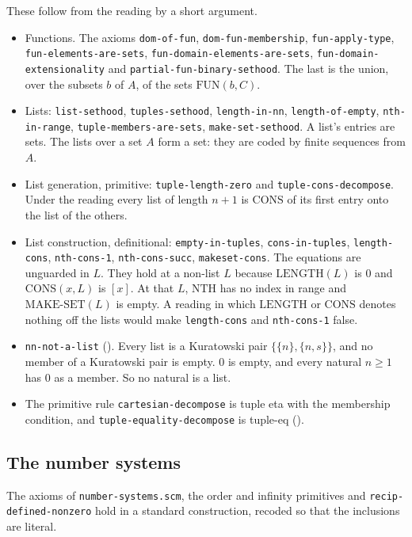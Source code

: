 These follow from the reading by a short argument.
\begin{itemize}
\item Functions.  The axioms \texttt{dom-of-fun},
  \texttt{dom-fun-membership}, \texttt{fun-apply-type},
  \texttt{fun-elements-are-sets},
  \texttt{fun-domain-elements-are-sets},
  \texttt{fun-domain-extensionality} and
  \texttt{partial-fun-binary-sethood}.  The last is the union, over the subsets $b$ of $A$, of the sets
  $\mathrm{FUN}(b,C)$.
\item Lists: \texttt{list-sethood}, \texttt{tuples-sethood},
  \texttt{length-in-nn}, \texttt{length-of-empty}, \texttt{nth-in-range},
  \texttt{tuple-members-are-sets}, \texttt{make-set-sethood}.  A list's
  entries are sets.  The lists over a set $A$ form a set: they are coded
  by finite sequences from $A$.
\item List generation, primitive: \texttt{tuple-length-zero} and
  \texttt{tuple-cons-decompose}.  Under the reading every list of length
  $n+1$ is $\mathrm{CONS}$ of its first entry onto the list of the
  others.
\item List construction, definitional: \texttt{empty-in-tuples},
  \texttt{cons-in-tuples}, \texttt{length-cons}, \texttt{nth-cons-1},
  \texttt{nth-cons-succ}, \texttt{makeset-cons}.  The equations are
  unguarded in $L$.  They hold at a non-list $L$ because
  $\mathrm{LENGTH}(L)$ is $0$ and $\mathrm{CONS}(x,L)$ is $[x]$.  At that
  $L$, $\mathrm{NTH}$ has no index in range and $\mathrm{MAKE\text{-}SET}(L)$
  is empty.  A reading in which $\mathrm{LENGTH}$ or $\mathrm{CONS}$
  denotes nothing off the lists would make \texttt{length-cons} and
  \texttt{nth-cons-1} false.
\item \texttt{nn-not-a-list} ().  Every list is a Kuratowski pair
  $\{\{n\},\{n,s\}\}$, and no member of a Kuratowski pair is empty.
  $0$ is empty, and every natural $n\geq1$ has $0$ as a member.
  So no natural is a list.
\item The primitive rule \texttt{cartesian-decompose} is tuple eta with
  the membership condition, and \texttt{tuple-equality-decompose} is
  tuple-eq ().
\end{itemize}

\subsection{The number systems}\label{sec:meta-numbers}

The axioms of \texttt{number-systems.scm}, the order and infinity
primitives and \texttt{recip-defined-nonzero} hold in a standard
construction, recoded so that the inclusions are literal.

